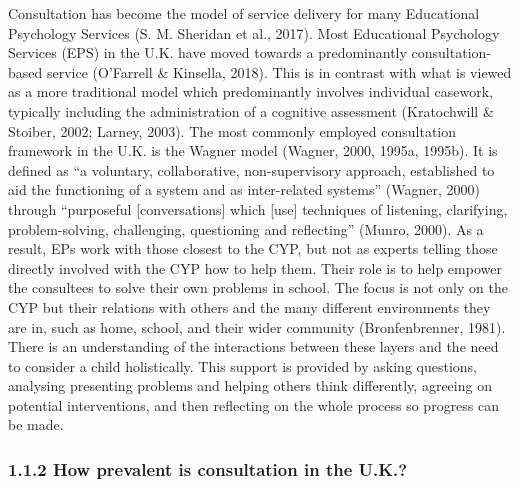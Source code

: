 \documentclass[
  english,
  man]{apa7}
\begin{document}
Consultation has become the model of service delivery for many Educational Psychology Services (S. M. Sheridan et al., 2017). Most Educational Psychology Services (EPS) in the U.K. have moved towards a predominantly consultation-based service (O'Farrell \& Kinsella, 2018). This is in contrast with what is viewed as a more traditional model which predominantly involves individual casework, typically including the administration of a cognitive assessment (Kratochwill \& Stoiber, 2002; Larney, 2003). The most commonly employed consultation framework in the U.K. is the Wagner model (Wagner, 2000, 1995a, 1995b). It is defined as ``a voluntary, collaborative, non-supervisory approach, established to aid the functioning of a system and as inter-related systems'' (Wagner, 2000) through ``purposeful {[}conversations{]} which {[}use{]} techniques of listening, clarifying, problem-solving, challenging, questioning and reflecting'' (Munro, 2000). As a result, EPs work with those closest to the CYP, but not as experts telling those directly involved with the CYP how to help them. Their role is to help empower the consultees to solve their own problems in school. The focus is not only on the CYP but their relations with others and the many different environments they are in, such as home, school, and their wider community (Bronfenbrenner, 1981). There is an understanding of the interactions between these layers and the need to consider a child holistically. This support is provided by asking questions, analysing presenting problems and helping others think differently, agreeing on potential interventions, and then reflecting on the whole process so progress can be made.

\hypertarget{how-prevalent-is-consultation-in-the-u.k.}{%
\subsubsection{1.1.2 How prevalent is consultation in the U.K.?}\label{how-prevalent-is-consultation-in-the-u.k.}}
\end{document}
